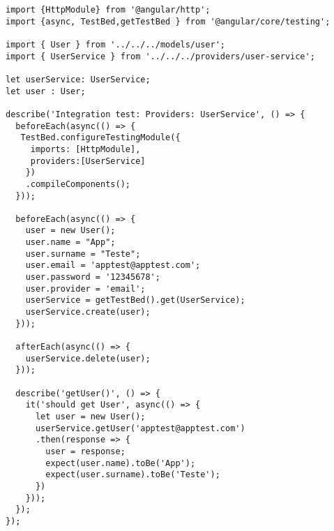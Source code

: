 \medskip
\begin{lstlisting}[caption=Exemplo de teste de integração do serviço de usuários]
import {HttpModule} from '@angular/http';
import {async, TestBed,getTestBed } from '@angular/core/testing';

import { User } from '../../../models/user';
import { UserService } from '../../../providers/user-service';

let userService: UserService;
let user : User;

describe('Integration test: Providers: UserService', () => {
  beforeEach(async(() => {
   TestBed.configureTestingModule({
     imports: [HttpModule],
     providers:[UserService]
    })
    .compileComponents();
  }));

  beforeEach(async(() => {
    user = new User();
    user.name = "App";
    user.surname = "Teste";
    user.email = 'apptest@apptest.com';
    user.password = '12345678';
    user.provider = 'email';
    userService = getTestBed().get(UserService);
    userService.create(user);
  }));

  afterEach(async(() => {
    userService.delete(user);
  }));

  describe('getUser()', () => {
    it('should get User', async(() => {
      let user = new User();
      userService.getUser('apptest@apptest.com')
      .then(response => {
        user = response;
        expect(user.name).toBe('App');
        expect(user.surname).toBe('Teste');
      })
    }));
  });
});
\end{lstlisting}
